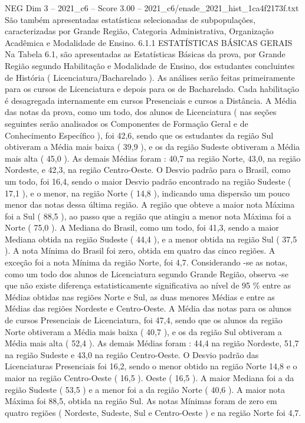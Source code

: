\begin{textsample}{NEG Dim 3 – 2021\_c6 – Score 3.00 – 2021\_c6/enade\_2021\_hist\_1ca4f2173f.txt}
São também apresentadas estatísticas selecionadas de subpopulações, caracterizadas por Grande Região, Categoria Administrativa, Organização Acadêmica e Modalidade de Ensino. 6.1.1 ESTATÍSTICAS BÁSICAS GERAIS Na Tabela 6.1, são apresentadas as Estatísticas Básicas da prova, por Grande Região segundo Habilitação e Modalidade de Ensino, dos estudantes concluintes de História ( Licenciatura/Bacharelado ).
As análises serão feitas primeiramente para os cursos de Licenciatura e depois para os de Bacharelado.
Cada habilitação é desagregada internamente em cursos Presenciais e cursos a Distância.
A Média das notas da prova, como um todo, dos alunos de Licenciatura ( nas seções seguintes serão analisados os Componentes de Formação Geral e de Conhecimento Específico ), foi 42,6, sendo que os estudantes da região Sul obtiveram a Média mais baixa ( 39,9 ), e os da região Sudeste obtiveram a Média mais alta ( 45,0 ).
As demais Médias foram : 40,7 na região Norte, 43,0, na região Nordeste, e 42,3, na região Centro-Oeste.
O Desvio padrão para o Brasil, como um todo, foi 16,4, sendo o maior Desvio padrão encontrado na região Sudeste ( 17,1 ), e o menor, na região Norte ( 14,8 ), indicando uma dispersão um pouco menor das notas dessa última região.
A região que obteve a maior nota Máxima foi a Sul ( 88,5 ), ao passo que a região que atingiu a menor nota Máxima foi a Norte ( 75,0 ).
A Mediana do Brasil, como um todo, foi 41,3, sendo a maior Mediana obtida na região Sudeste ( 44,4 ), e a menor obtida na região Sul ( 37,5 ).
A nota Mínima do Brasil foi zero, obtida em quatro das cinco regiões.
A exceção foi a nota Mínima da região Norte, foi 4,7.
Considerando -se as notas, como um todo dos alunos de Licenciatura segundo Grande Região, observa -se que não existe diferença estatisticamente significativa ao nível de 95 \% entre as Médias obtidas nas regiões Norte e Sul, as duas menores Médias e entre as Médias das regiões Nordeste e Centro-Oeste.
A Média das notas para os alunos de cursos Presenciais de Licenciatura, foi 47,4, sendo que os alunos da região Norte obtiveram a Média mais baixa ( 40,7 ), e os da região Sul obtiveram a Média mais alta ( 52,4 ).
As demais Médias foram : 44,4 na região Nordeste, 51,7 na região Sudeste e 43,0 na região Centro-Oeste.
O Desvio padrão das Licenciaturas Presenciais foi 16,2, sendo o menor obtido na região Norte 14,8 e o maior na região Centro-Oeste ( 16,5 ).
Oeste ( 16,5 ).
A maior Mediana foi a da região Sudeste ( 53,5 ) e a menor foi a da região Norte ( 40,6 ).
A maior nota Máxima foi 88,5, obtida na região Sul.
As notas Mínimas foram de zero em quatro regiões ( Nordeste, Sudeste, Sul e Centro-Oeste ) e na região Norte foi 4,7.

\end{textsample}
